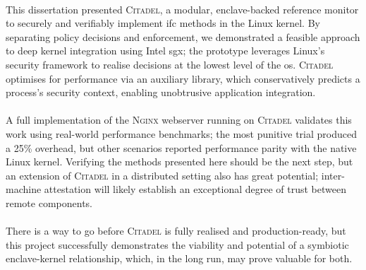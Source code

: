 \paragraph{} This dissertation presented \textsc{Citadel}, a modular, enclave-backed reference monitor to securely and verifiably implement \acrshort{ifc} methods in the Linux kernel. By separating policy decisions and enforcement, we demonstrated a feasible approach to deep kernel integration using Intel \acrshort{sgx}; the prototype leverages Linux's security framework to realise decisions at the lowest level of the \acrshort{os}. \textsc{Citadel} optimises for performance via an auxiliary library, which conservatively predicts a process's security context, enabling unobtrusive application integration.

\paragraph{} A full implementation of the \textsc{Nginx} webserver running on \textsc{Citadel} validates this work using real-world performance benchmarks; the most punitive trial produced a 25\% overhead, but other scenarios reported performance parity with the native Linux kernel. Verifying the methods presented here should be the next step, but an extension of \textsc{Citadel} in a distributed setting also has great potential; inter-machine attestation will likely establish an exceptional degree of trust between remote components.


\paragraph{} There is a way to go before \textsc{Citadel} is fully realised and production-ready, but this project successfully demonstrates the viability and potential of a symbiotic enclave-kernel relationship, which, in the long run, may prove valuable for both.